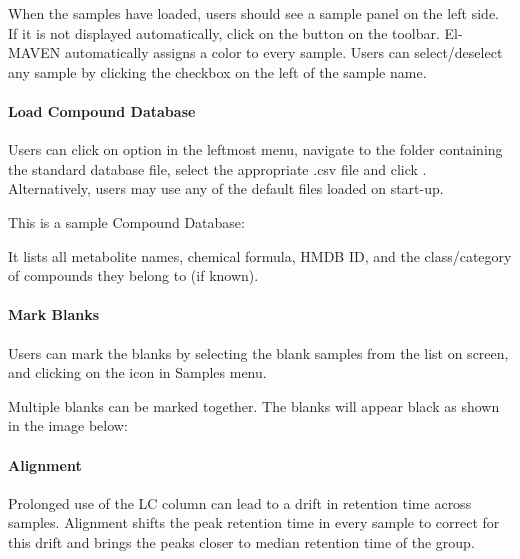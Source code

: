 \documentclass[letterpaper,10pt,english,openany,oneside]{sphinxmanual}
\begin{document}

When the samples have loaded, users should see a sample panel on the left side. If it is not displayed automatically, click on the  button on the toolbar. El-MAVEN automatically assigns a color to every sample. Users can select/deselect any sample by clicking the checkbox on the left of the sample name.



\paragraph{Load Compound Database}
\label{\detokenize{LabeledLCMSWorkflow:load-compound-database}}
Users can click on  option in the leftmost menu, navigate to the folder containing the standard database file, select the appropriate .csv file and click . Alternatively, users may use any of the default files loaded on start-up.


This is a sample Compound Database:


It lists all metabolite names, chemical formula, HMDB ID, and the class/category of compounds they belong to (if known).


\paragraph{Mark Blanks}
\label{\detokenize{LabeledLCMSWorkflow:mark-blanks}}
Users can mark the blanks by selecting the blank samples from the list on screen, and clicking on the  icon  in Samples menu.


Multiple blanks can be marked together. The blanks will appear black as shown in the image below:



\paragraph{Alignment}
\label{\detokenize{LabeledLCMSWorkflow:alignment}}
Prolonged use of the LC column can lead to a drift in retention time across samples. Alignment shifts the peak retention time in every sample to correct for this drift and brings the peaks closer to median retention time of the group.
\end{document}

